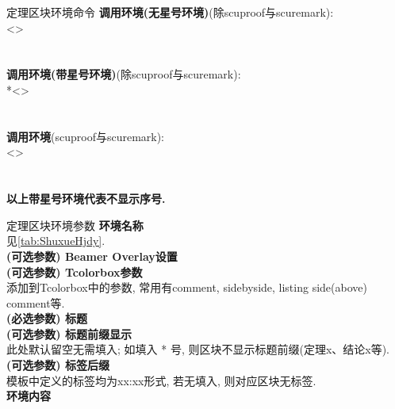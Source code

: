 \begin{frame}{定理区块环境命令}
	\textbf{调用环境(无星号环境)}(除scuproof与scuremark):\\
	\textcolor{scugrey}{<>}\textcolor{scugrey}{}\\
	\hspace*{1em}\\
	\\[1ex]
	\textbf{调用环境(带星号环境)}(除scuproof与scuremark):\\
	*\textcolor{scugrey}{<>}\textcolor{scugrey}{}\\
	\hspace*{1em}\\
	\\[1ex]
	\textbf{调用环境}(scuproof与scuremark):\\
	\textcolor{scugrey}{<>}\\
	\hspace*{1em}\\
	\\[1ex]
	\textbf{以上带星号环境代表不显示序号.}
\end{frame}

\begin{frame}{定理区块环境参数}
	\alert{}\hfill \textbf{环境名称}\\
	见\vref{tab:ShuxueHjdy}.\\

	\alert{}\hfill \textbf{(可选参数) Beamer Overlay设置}\\

	\alert{}\hfill \textbf{(可选参数) Tcolorbox参数}\\
	添加到Tcolorbox中的参数, 常用有comment, sidebyside, listing side(above) comment等.\\

	\alert{}\hfill \textbf{(必选参数) 标题}\\

	\alert{}\hfill \textbf{(可选参数) 标题前缀显示}\\
	此处默认留空无需填入; 如填入 * 号, 则区块不显示标题前缀(定理x、结论x等).\\

	\alert{}\hfill \textbf{(可选参数) 标签后缀}\\
	模板中定义的标签均为xx:xx形式, 若无填入, 则对应区块无标签.\\

	\alert{}\hfill \textbf{环境内容}
\end{frame}


